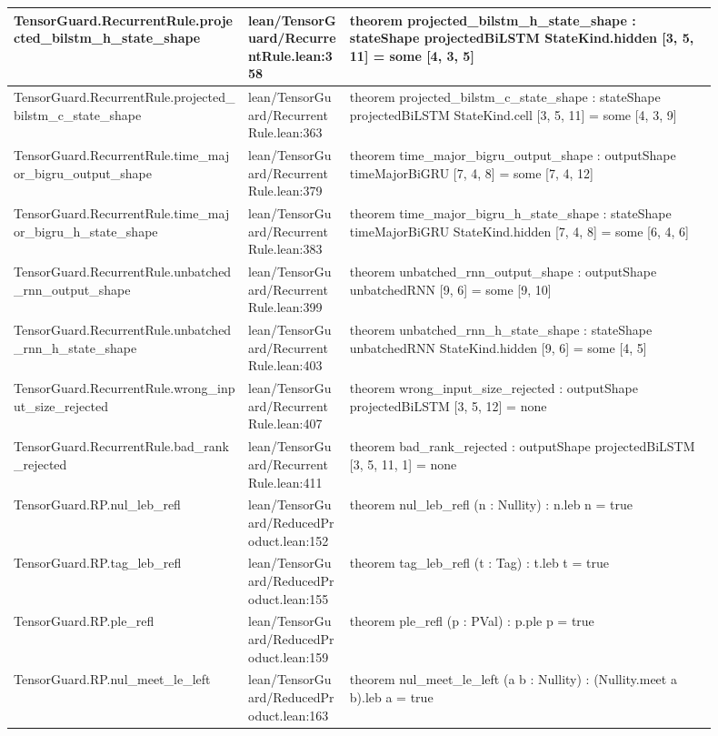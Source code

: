 \documentclass[10pt]{article}
\begin{document}
\begin{longtable}{|p{0.30\linewidth}|p{0.13\linewidth}|p{0.47\linewidth}|}
\hline
TensorGuard.RecurrentRule.projected\_bilstm\_h\_state\_shape & lean/TensorGuard/RecurrentRule.lean:358 & theorem projected\_bilstm\_h\_state\_shape : stateShape projectedBiLSTM StateKind.hidden [3, 5, 11] = some [4, 3, 5] \\
\hline
TensorGuard.RecurrentRule.projected\_bilstm\_c\_state\_shape & lean/TensorGuard/RecurrentRule.lean:363 & theorem projected\_bilstm\_c\_state\_shape : stateShape projectedBiLSTM StateKind.cell [3, 5, 11] = some [4, 3, 9] \\
\hline
TensorGuard.RecurrentRule.time\_major\_bigru\_output\_shape & lean/TensorGuard/RecurrentRule.lean:379 & theorem time\_major\_bigru\_output\_shape : outputShape timeMajorBiGRU [7, 4, 8] = some [7, 4, 12] \\
\hline
TensorGuard.RecurrentRule.time\_major\_bigru\_h\_state\_shape & lean/TensorGuard/RecurrentRule.lean:383 & theorem time\_major\_bigru\_h\_state\_shape : stateShape timeMajorBiGRU StateKind.hidden [7, 4, 8] = some [6, 4, 6] \\
\hline
TensorGuard.RecurrentRule.unbatched\_rnn\_output\_shape & lean/TensorGuard/RecurrentRule.lean:399 & theorem unbatched\_rnn\_output\_shape : outputShape unbatchedRNN [9, 6] = some [9, 10] \\
\hline
TensorGuard.RecurrentRule.unbatched\_rnn\_h\_state\_shape & lean/TensorGuard/RecurrentRule.lean:403 & theorem unbatched\_rnn\_h\_state\_shape : stateShape unbatchedRNN StateKind.hidden [9, 6] = some [4, 5] \\
\hline
TensorGuard.RecurrentRule.wrong\_input\_size\_rejected & lean/TensorGuard/RecurrentRule.lean:407 & theorem wrong\_input\_size\_rejected : outputShape projectedBiLSTM [3, 5, 12] = none \\
\hline
TensorGuard.RecurrentRule.bad\_rank\_rejected & lean/TensorGuard/RecurrentRule.lean:411 & theorem bad\_rank\_rejected : outputShape projectedBiLSTM [3, 5, 11, 1] = none \\
\hline
TensorGuard.RP.nul\_leb\_refl & lean/TensorGuard/ReducedProduct.lean:152 & theorem nul\_leb\_refl (n : Nullity) : n.leb n = true \\
\hline
TensorGuard.RP.tag\_leb\_refl & lean/TensorGuard/ReducedProduct.lean:155 & theorem tag\_leb\_refl (t : Tag) : t.leb t = true \\
\hline
TensorGuard.RP.ple\_refl & lean/TensorGuard/ReducedProduct.lean:159 & theorem ple\_refl (p : PVal) : p.ple p = true \\
\hline
TensorGuard.RP.nul\_meet\_le\_left & lean/TensorGuard/ReducedProduct.lean:163 & theorem nul\_meet\_le\_left (a b : Nullity) : (Nullity.meet a b).leb a = true \\

\end{longtable}
\end{document}
